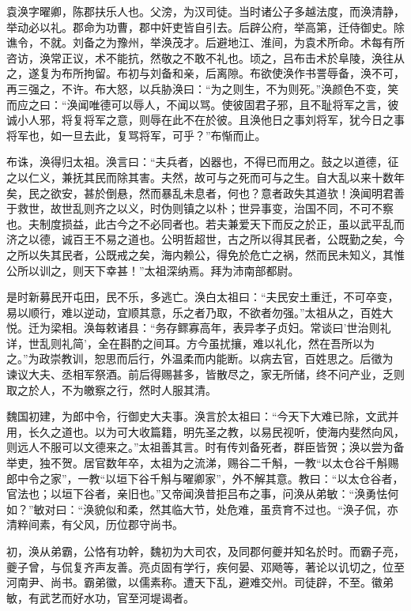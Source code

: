 \documentclass[12pt,UTF8]{ctexbook}
\begin{document}
袁涣字曜卿，陈郡扶乐人也。父滂，为汉司徒。当时诸公子多越法度，而涣清静，举动必以礼。郡命为功曹，郡中奸吏皆自引去。后辟公府，举高第，迁侍御史。除谯令，不就。刘备之为豫州，举涣茂才。后避地江、淮间，为袁术所命。术每有所咨访，涣常正议，术不能抗，然敬之不敢不礼也。顷之，吕布击术於阜陵，涣往从之，遂复为布所拘留。布初与刘备和亲，后离隙。布欲使涣作书詈辱备，涣不可，再三强之，不许。布大怒，以兵胁涣曰：“为之则生，不为则死。”涣颜色不变，笑而应之曰：“涣闻唯德可以辱人，不闻以骂。使彼固君子邪，且不耻将军之言，彼诚小人邪，将复将军之意，则辱在此不在於彼。且涣他日之事刘将军，犹今日之事将军也，如一旦去此，复骂将军，可乎？”布惭而止。

布诛，涣得归太祖。涣言曰：“夫兵者，凶器也，不得已而用之。鼓之以道德，征之以仁义，兼抚其民而除其害。夫然，故可与之死而可与之生。自大乱以来十数年矣，民之欲安，甚於倒悬，然而暴乱未息者，何也？意者政失其道欤！涣闻明君善于救世，故世乱则齐之以义，时伪则镇之以朴；世异事变，治国不同，不可不察也。夫制度损益，此古今之不必同者也。若夫兼爱天下而反之於正，虽以武平乱而济之以德，诚百王不易之道也。公明哲超世，古之所以得其民者，公既勤之矣，今之所以失其民者，公既戒之矣，海内赖公，得免於危亡之祸，然而民未知义，其惟公所以训之，则天下幸甚！”太祖深纳焉。拜为沛南部都尉。

是时新募民开屯田，民不乐，多逃亡。涣白太祖曰：“夫民安土重迁，不可卒变，易以顺行，难以逆动，宜顺其意，乐之者乃取，不欲者勿强。”太祖从之，百姓大悦。迁为梁相。涣每敕诸县：“务存鳏寡高年，表异孝子贞妇。常谈曰'世治则礼详，世乱则礼简'，全在斟酌之间耳。方今虽扰攘，难以礼化，然在吾所以为之。”为政崇教训，恕思而后行，外温柔而内能断。以病去官，百姓思之。后徵为 谏议大夫、丞相军祭酒。前后得赐甚多，皆散尽之，家无所储，终不问产业，乏则取之於人，不为皦察之行，然时人服其清。

魏国初建，为郎中令，行御史大夫事。涣言於太祖曰：“今天下大难已除，文武并用，长久之道也。以为可大收篇籍，明先圣之教，以易民视听，使海内斐然向风，则远人不服可以文德来之。”太祖善其言。时有传刘备死者，群臣皆贺；涣以尝为备举吏，独不贺。居官数年卒，太祖为之流涕，赐谷二千斛，一教“以太仓谷千斛赐郎中令之家”，一教“以垣下谷千斛与曜卿家”，外不解其意。教曰：“以太仓谷者，官法也；以垣下谷者，亲旧也。”又帝闻涣昔拒吕布之事，问涣从弟敏：“涣勇怯何如？”敏对曰：“涣貌似和柔，然其临大节，处危难，虽贲育不过也。“涣子侃，亦清粹间素，有父风，历位郡守尚书。

初，涣从弟霸，公恪有功幹，魏初为大司农，及同郡何夔并知名於时。而霸子亮，夔子曾，与侃复齐声友善。亮贞固有学行，疾何晏、邓飏等，著论以讥切之，位至河南尹、尚书。霸弟徽，以儒素称。遭天下乱，避难交州。司徒辟，不至。徽弟敏，有武艺而好水功，官至河堤谒者。
\end{document}
